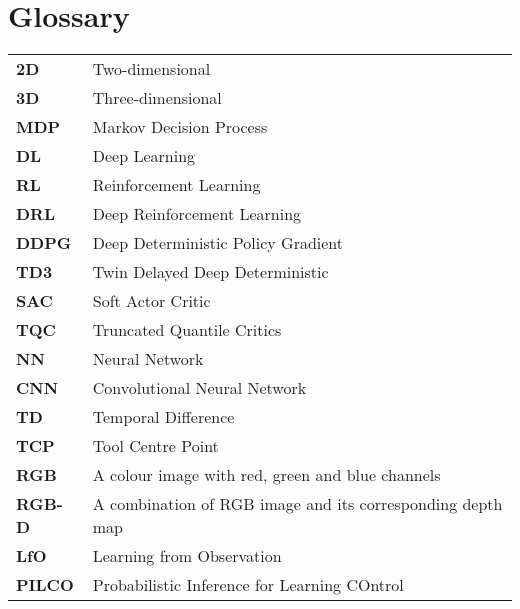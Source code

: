 %
\chapter*{Glossary}

\capstartfalse
\begin{table}[!hb]
    \begin{tabular}{ll}
        \textbf{2D}    & Two-dimensional                                            \\
        \textbf{3D}    & Three-dimensional                                          \\
        \textbf{MDP}   & Markov Decision Process                                    \\
        \textbf{DL}    & Deep Learning                                              \\
        \textbf{RL}    & Reinforcement Learning                                     \\
        \textbf{DRL}   & Deep Reinforcement Learning                                \\
        \textbf{DDPG}  & Deep Deterministic Policy Gradient                         \\
        \textbf{TD3}   & Twin Delayed Deep Deterministic                            \\
        \textbf{SAC}   & Soft Actor Critic                                          \\
        \textbf{TQC}   & Truncated Quantile Critics                                 \\
        \textbf{NN}    & Neural Network                                             \\
        \textbf{CNN}   & Convolutional Neural Network                               \\
        \textbf{TD}    & Temporal Difference                                        \\
        \textbf{TCP}   & Tool Centre Point                                          \\
        \textbf{RGB}   & A colour image with red, green and blue channels           \\
        \textbf{RGB-D} & A combination of RGB image and its corresponding depth map \\
        \textbf{LfO}   & Learning from Observation                                  \\
        \textbf{PILCO} & Probabilistic Inference for Learning COntrol               \\

\end{tabular}
\end{table}
